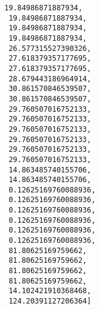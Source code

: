 \documentclass[11pt]{article}
\makeatletter
\newcommand{\boxspacing}{\kern\kvtcb@left@rule\kern\kvtcb@boxsep}
\newcommand{\prompt}[4]{
        {\ttfamily\llap{{\color{#2}[#3]:\hspace{3pt}#4}}\vspace{-\baselineskip}}
    }
\makeatother
\begin{document}
\begin{tcolorbox}[breakable, size=fbox, boxrule=.5pt, pad at break*=1mm, opacityfill=0]
\begin{Verbatim}[commandchars=\\\{\}]
 19.84986871887934,
 19.84986871887934,
 19.84986871887934,
 19.84986871887934,
 26.577315527390326,
 27.618379357177695,
 27.618379357177695,
 28.679443186964914,
 30.861570846539507,
 30.861570846539507,
 29.760507016752133,
 29.760507016752133,
 29.760507016752133,
 29.760507016752133,
 29.760507016752133,
 29.760507016752133,
 14.863485740155706,
 14.863485740155706,
 0.12625169760088936,
 0.12625169760088936,
 0.12625169760088936,
 0.12625169760088936,
 0.12625169760088936,
 0.12625169760088936,
 81.80625169759662,
 81.80625169759662,
 81.80625169759662,
 81.80625169759662,
 14.102421910368468,
 124.20391127206364]
\end{Verbatim}
\end{tcolorbox}
        
    \begin{tcolorbox}[breakable, size=fbox, boxrule=1pt, pad at break*=1mm,colback=cellbackground, colframe=cellborder]
\prompt{In}{incolor}{ }{\boxspacing}
\begin{Verbatim}[commandchars=\\\{\}]

\end{Verbatim}
\end{tcolorbox}


    
    
    
\end{document}
